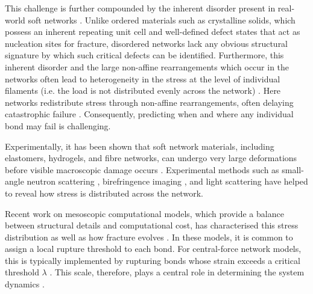 This challenge is further compounded by the inherent disorder present in real-world soft networks \cite{broedersz_modeling_2014,broedersz_criticality_2011,feng_nonlinear_2016}. Unlike ordered materials such as crystalline solids, which possess an inherent repeating unit cell and well-defined defect states that act as nucleation sites for fracture, disordered networks lack any obvious structural signature by which such critical defects can be identified. Furthermore, this inherent disorder and the large non-affine rearrangements which occur in the networks often lead to heterogeneity in the stress at the level of individual filaments (i.e. the load is not distributed evenly across the network) \cite{Liang2016,tauber_microscopic_2020,tauber_sharing_2021,broedersz_modeling_2014,storm_nonlinear_2005,bouzidNetworkTopologySoft2018}. Here networks redistribute stress through non-affine rearrangements, often delaying catastrophic failure \cite{shivers_scaling_2019,tauber_sharing_2021,ducrot_structure_2015, tominaga_molecular_2007}. Consequently, predicting when and where any individual bond may fail is challenging.

Experimentally, it has been shown that soft network materials, including elastomers, hydrogels, and fibre networks, can undergo very large deformations before visible macroscopic damage occurs \cite{gong_why_2010,Kim2021,ducrot_toughening_2014,Creton50th2017,aimeMicroscopicDynamicsFailure2018,storm_nonlinear_2005}. Experimental methods such as small-angle neutron scattering \cite{ducrot_structure_2015,tominaga_molecular_2007}, birefringence imaging \cite{gong_double-network_2003,zheng_how_2021}, and light scattering \cite{porr_probing_2025} have helped to reveal how stress is distributed across the network. 

Recent work on mesoscopic computational models, which provide a balance between structural details and computational cost, has characterised this stress distribution \cite{shivers_normal_2019,shivers_scaling_2019,LernerCoordination2024,storm_nonlinear_2005} as well as how fracture evolves \cite{tauber_microscopic_2020,tauber_sharing_2021,tauber_role_2020,dussi_athermal_2020}. In these models, it is common to assign a local rupture threshold to each bond. For central-force network models, this is typically implemented by rupturing bonds whose strain exceeds a critical threshold $\lambda$ \cite{tauber_role_2020,dussi_athermal_2020}. This scale, therefore, plays a central role in determining the system dynamics \cite{tauber_microscopic_2020}.

